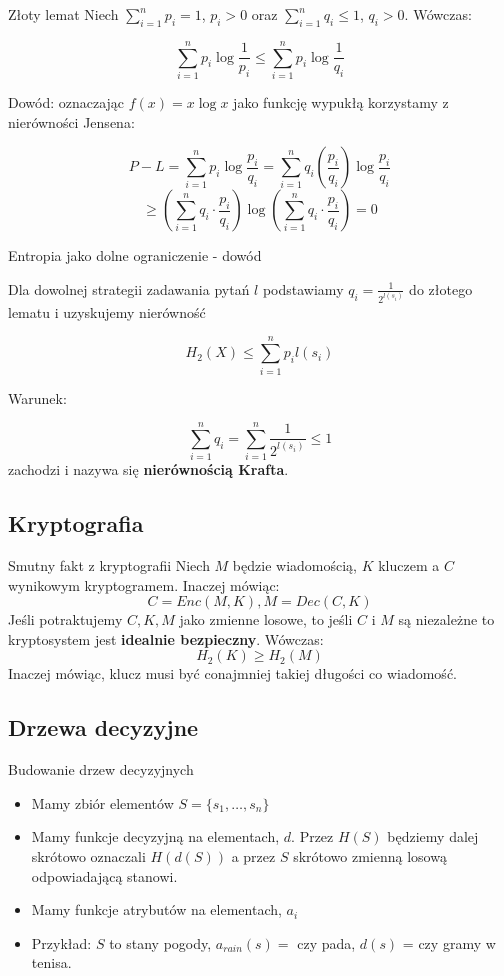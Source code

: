 \documentclass{beamer}
\begin{document}
\begin{frame}{Złoty lemat}
Niech $\sum_{i=1}^{n} p_i = 1$, $p_i > 0$ oraz $\sum_{i=1}^{n} q_i \leq 1$, $q_i > 0$. Wówczas:

$$
\sum_{i=1}^{n} p_i \log{\frac{1}{p_i}} \leq \sum_{i=1}^{n} p_i \log{\frac{1}{q_i}}
$$

Dowód: oznaczając $f(x) = x \log{x}$ jako funkcję wypukłą korzystamy
z nierówności Jensena:

$$
P - L = \sum_{i=1}^{n} p_i \log{\frac{p_i}{q_i}}
= \sum_{i=1}^{n} q_i \left(\frac{p_i}{q_i}\right) \log{\frac{p_i}{q_i}}
$$
$$
\geq \left( \sum_{i=1}^n q_i \cdot \frac{p_i}{q_i} \right) \log{\left( \sum_{i=1}^n q_i \cdot \frac{p_i}{q_i} \right)}
= 0
$$

\end{frame}


\begin{frame}{Entropia jako dolne ograniczenie - dowód}

Dla dowolnej strategii zadawania pytań $l$ podstawiamy
$q_i = \frac{1}{2^{l(s_i)}}$ do złotego lematu i uzyskujemy nierówność

$$
H_2(X) \leq \sum_{i=1}^{n} p_i l(s_i)
$$

Warunek:

$$
\sum_{i=1}^n q_i = \sum_{i=1}^n \frac{1}{2^{l(s_i)}} \leq 1
$$
zachodzi i nazywa się \textbf{nierównością Krafta}.
\end{frame}


\subsection{Kryptografia}

\begin{frame}{Smutny fakt z kryptografii}
Niech $M$ będzie wiadomością, $K$ kluczem a $C$ wynikowym kryptogramem. Inaczej mówiąc:
$$
C = Enc(M, K), M = Dec(C, K)
$$
Jeśli potraktujemy $C, K, M$ jako zmienne losowe, to jeśli $C$ i $M$ są niezależne
to kryptosystem jest \textbf{idealnie bezpieczny}. Wówczas:
$$
H_2(K) \geq H_2(M)
$$
Inaczej mówiąc, klucz musi być conajmniej takiej długości co wiadomość.
\end{frame}


\subsection{Drzewa decyzyjne}

\begin{frame}{Budowanie drzew decyzyjnych}
\begin{itemize}
\item Mamy zbiór elementów $S = \{s_1, \ldots ,s_n\}$
\item Mamy funkcje decyzyjną na elementach, $d$. Przez $H(S)$ będziemy dalej
skrótowo oznaczali $H(d(S))$ a przez $S$ skrótowo zmienną losową odpowiadającą
stanowi.
\item Mamy funkcje atrybutów na elementach, $a_i$
\item Przykład: $S$ to stany pogody, $a_{rain}(s) = $ czy pada, $d(s)$ =
czy gramy w tenisa.
\end{itemize}
\end{frame}
\end{document}
